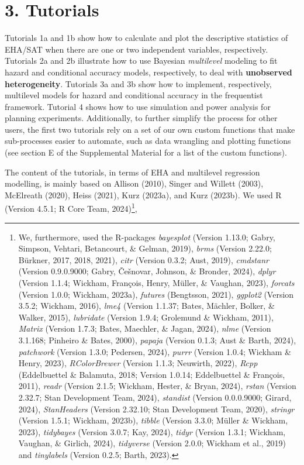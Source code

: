 \documentclass[
  english,
  man, donotrepeattitle,floatsintext]{apa6}
\begin{document}
\section{3. Tutorials}\label{tutorials}

Tutorials 1a and 1b show how to calculate and plot the descriptive statistics of EHA/SAT when there are one or two independent variables, respectively. Tutorials 2a and 2b illustrate how to use Bayesian \emph{multilevel} modeling to fit hazard and conditional accuracy models, respectively, to deal with \textbf{unobserved heterogeneity}. Tutorials 3a and 3b show how to implement, respectively, multilevel models for hazard and conditional accuracy in the frequentist framework. Tutorial 4 shows how to use simulation and power analysis for planning experiments.
Additionally, to further simplify the process for other users, the first two tutorials rely on a set of our own custom functions that make sub-processes easier to automate, such as data wrangling and plotting functions (see section E of the Supplemental Material for a list of the custom functions).

The content of the tutorials, in terms of EHA and multilevel regression modelling, is mainly based on Allison (2010), Singer and Willett (2003), McElreath (2020), Heiss (2021), Kurz (2023a), and Kurz (2023b).
We used R (Version 4.5.1; R Core Team, 2024)\footnote{We, furthermore, used the R-packages \emph{bayesplot} (Version 1.13.0; Gabry, Simpson, Vehtari, Betancourt, \& Gelman, 2019), \emph{brms} (Version 2.22.0; Bürkner, 2017, 2018, 2021), \emph{citr} (Version 0.3.2; Aust, 2019), \emph{cmdstanr} (Version 0.9.0.9000; Gabry, Češnovar, Johnson, \& Bronder, 2024), \emph{dplyr} (Version 1.1.4; Wickham, François, Henry, Müller, \& Vaughan, 2023), \emph{forcats} (Version 1.0.0; Wickham, 2023a), \emph{futures} (Bengtsson, 2021), \emph{ggplot2} (Version 3.5.2; Wickham, 2016), \emph{lme4} (Version 1.1.37; Bates, Mächler, Bolker, \& Walker, 2015), \emph{lubridate} (Version 1.9.4; Grolemund \& Wickham, 2011), \emph{Matrix} (Version 1.7.3; Bates, Maechler, \& Jagan, 2024), \emph{nlme} (Version 3.1.168; Pinheiro \& Bates, 2000), \emph{papaja} (Version 0.1.3; Aust \& Barth, 2024), \emph{patchwork} (Version 1.3.0; Pedersen, 2024), \emph{purrr} (Version 1.0.4; Wickham \& Henry, 2023), \emph{RColorBrewer} (Version 1.1.3; Neuwirth, 2022), \emph{Rcpp} (Eddelbuettel \& Balamuta, 2018; Version 1.0.14; Eddelbuettel \& François, 2011), \emph{readr} (Version 2.1.5; Wickham, Hester, \& Bryan, 2024), \emph{rstan} (Version 2.32.7; Stan Development Team, 2024), \emph{standist} (Version 0.0.0.9000; Girard, 2024), \emph{StanHeaders} (Version 2.32.10; Stan Development Team, 2020), \emph{stringr} (Version 1.5.1; Wickham, 2023b), \emph{tibble} (Version 3.3.0; Müller \& Wickham, 2023), \emph{tidybayes} (Version 3.0.7; Kay, 2024), \emph{tidyr} (Version 1.3.1; Wickham, Vaughan, \& Girlich, 2024), \emph{tidyverse} (Version 2.0.0; Wickham et al., 2019) and \emph{tinylabels} (Version 0.2.5; Barth, 2023).},
\end{document}
